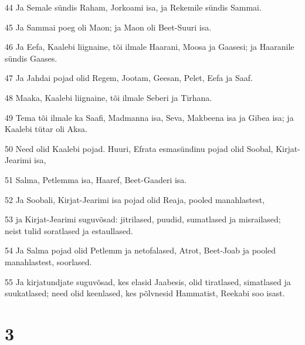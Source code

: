 \par 44 Ja Semale sündis Raham, Jorkoami isa, ja Rekemile sündis Sammai.
\par 45 Ja Sammai poeg oli Maon; ja Maon oli Beet-Suuri isa.
\par 46 Ja Eefa, Kaalebi liignaine, tõi ilmale Haarani, Moosa ja Gaasesi; ja Haaranile sündis Gaases.
\par 47 Ja Jahdai pojad olid Regem, Jootam, Geesan, Pelet, Eefa ja Saaf.
\par 48 Maaka, Kaalebi liignaine, tõi ilmale Seberi ja Tirhana.
\par 49 Tema tõi ilmale ka Saafi, Madmanna isa, Seva, Makbeena isa ja Gibea isa; ja Kaalebi tütar oli Aksa.
\par 50 Need olid Kaalebi pojad. Huuri, Efrata esmasündinu pojad olid Soobal, Kirjat-Jearimi isa,
\par 51 Salma, Petlemma isa, Haaref, Beet-Gaaderi isa.
\par 52 Ja Soobali, Kirjat-Jearimi isa pojad olid Reaja, pooled manahlastest,
\par 53 ja Kirjat-Jearimi suguvõsad: jitrilased, puudid, sumatlased ja misrailased; neist tulid soratlased ja estaullased.
\par 54 Ja Salma pojad olid Petlemm ja netofalased, Atrot, Beet-Joab ja pooled manahlastest, soorlased.
\par 55 Ja kirjatundjate suguvõsad, kes elasid Jaabesis, olid tiratlased, simatlased ja suukatlased; need olid keenlased, kes põlvnesid Hammatist, Reekabi soo isast.

\chapter{3}

